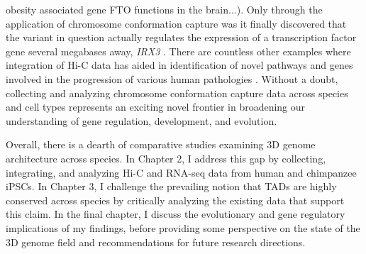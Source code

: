 {obesity associated gene FTO functions in the brain...)}. Only through the application of chromosome conformation capture was it finally discovered that the variant in question actually regulates the expression of a transcription factor gene several megabases away, \textit{IRX3} \cite{Smemo et al. 2014 (Obesity-associated variants within FTO form long-range functional connections with IRX3)}. There are countless other examples where integration of Hi-C data has aided in identification of novel pathways and genes involved in the progression of various human pathologies \cite{Martin et al. 2015 (Capture Hi-C reveals novel candidate genes and complex long-range interactions with related autoimmune risk loci), Martin et al. 2016 (Identifying Causal Genes at the Multiple Sclerosis Associated Region 6q23 Using Capture Hi-C), Matoba et al. 2020 (Mapping Alzheimer's Disease Variants to Their Target Genes Using Computational Analysis of Chromatin Configuration), Wu and Pan 2018 (Integration of Enhancer-Promoter Interactions with GWAS Summary Results Identifies Novel Schizophrenia-Associated Genes and Pathways)}. Without a doubt, collecting and analyzing chromosome conformation capture data across species and cell types represents an exciting novel frontier in broadening our understanding of gene regulation, development, and evolution.

Overall, there is a dearth of comparative studies examining 3D genome architecture across species. In Chapter 2, I address this gap by collecting, integrating, and analyzing Hi-C and RNA-seq data from human and chimpanzee iPSCs. In Chapter 3, I challenge the prevailing notion that TADs are highly conserved across species by critically analyzing the existing data that support this claim. In the final chapter, I discuss the evolutionary and gene regulatory implications of my findings, before providing some perspective on the state of the 3D genome field and recommendations for future research directions.